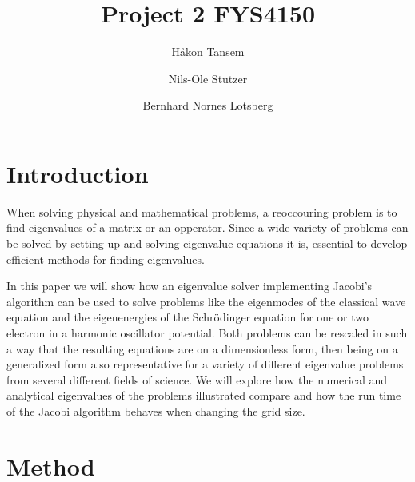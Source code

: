 \documentclass[twocolumn]{aastex62}
\begin{document}
\title{Project 2 FYS4150}




\author{Håkon Tansem}

\author{Nils-Ole Stutzer}

\author{Bernhard Nornes Lotsberg}

\begin{abstract}

\end{abstract}

\section{Introduction} \label{sec:intro}
When solving physical and mathematical problems, a reoccouring problem is to find eigenvalues of a matrix or an opperator. Since a wide variety of problems can be solved by setting up and solving eigenvalue equations it is, essential to develop efficient methods for finding eigenvalues. 

In this paper we will show how an eigenvalue solver implementing Jacobi's algorithm can be used to solve problems like the eigenmodes of the classical wave equation and the eigenenergies of the Schrödinger equation for one or two electron in a harmonic oscillator potential. Both problems can be rescaled in such a way that the resulting equations are on a dimensionless form, then being on a generalized form also representative for a variety of different eigenvalue problems from several different fields of science. We will explore how the numerical and analytical eigenvalues of the problems illustrated compare and how the run time of the Jacobi algorithm behaves when changing the grid size.   

\section{Method} \label{sec:method}
\end{document}
